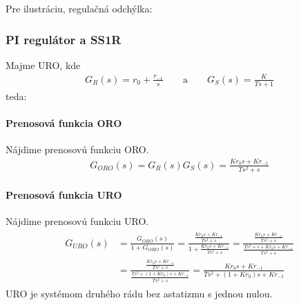\documentclass[a4paper, 10pt, ]{article}
\begin{document}
\noindent
Pre ilustráciu, regulačná odchýlka:


\begin{center}



    \figcaption{}

\end{center}








\subsubsection{PI regulátor a SS1R}

Majme URO, kde
\begin{align}
    G_R(s) = r_0 + \frac{r_{-1}}{s} \qquad \text{a} \qquad  G_S(s) = \frac{K}{Ts+1}
\end{align}
teda:

\begin{center}

    \makebox[\textwidth][c]{%
    
    }

	\figcaption{}
	\label{URO_PI_SS1R}

\end{center}


\paragraph{Prenosová funkcia ORO}
Nájdime prenosovú funkciu ORO.
\begin{align}
    G_{ORO}(s) = G_R(s) G_S(s) =  \frac{K r_0 s + Kr_{-1}}{Ts^2+s}
\end{align}




\paragraph{Prenosová funkcia URO}
Nájdime prenosovú funkciu URO.
\begin{align}
    \begin{aligned}
    G_{URO}(s)
    &=  \frac{G_{ORO}(s)}{1+G_{ORO}(s)}
    = \frac{   \frac{K r_0 s + Kr_{-1}}{Ts^2+s}   }{   1+  \frac{K r_0 s + Kr_{-1}}{Ts^2+s} }
    = \frac{   \frac{K r_0 s + Kr_{-1}}{Ts^2+s}   }{   \frac{Ts^2+s + K r_0 s + Kr_{-1}}{Ts^2+s} } \\
    &= \frac{   \frac{K r_0 s + Kr_{-1}}{Ts^2+s}   }{   \frac{Ts^2+  (1 + K r_0) s + Kr_{-1}}{Ts^2+s} }
    = \frac{   K r_0 s + Kr_{-1}   }{   Ts^2+  (1 + K r_0) s + Kr_{-1} }
    \end{aligned}
\end{align}
URO je systémom druhého rádu bez astatizmu s jednou nulou.
\end{document}
